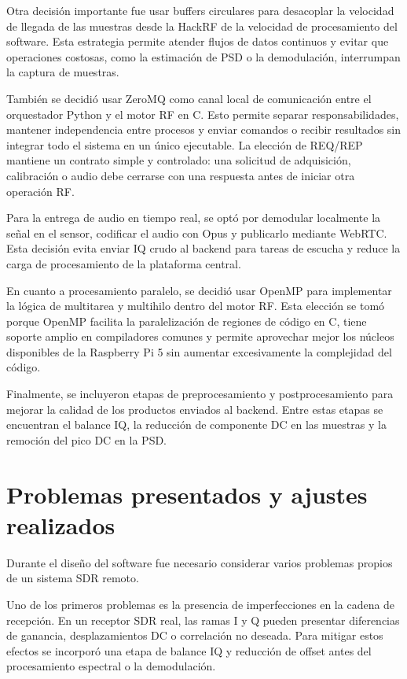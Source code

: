 Otra decisión importante fue usar buffers circulares para desacoplar la velocidad
de llegada de las muestras desde la HackRF de la velocidad de procesamiento del
software. Esta estrategia permite atender flujos de datos continuos y evitar que
operaciones costosas, como la estimación de PSD o la demodulación, interrumpan la
captura de muestras.

También se decidió usar ZeroMQ como canal local de comunicación entre el
orquestador Python y el motor RF en C. Esto permite separar responsabilidades,
mantener independencia entre procesos y enviar comandos o recibir resultados sin
integrar todo el sistema en un único ejecutable. La elección de REQ/REP mantiene
un contrato simple y controlado: una solicitud de adquisición, calibración o audio
debe cerrarse con una respuesta antes de iniciar otra operación RF.

Para la entrega de audio en tiempo real, se optó por demodular localmente la señal
en el sensor, codificar el audio con Opus y publicarlo mediante WebRTC. Esta
decisión evita enviar IQ crudo al backend para tareas de escucha y reduce la carga
de procesamiento de la plataforma central.

En cuanto a procesamiento paralelo, se decidió usar OpenMP para implementar la
lógica de multitarea y multihilo dentro del motor RF. Esta elección se tomó porque
OpenMP facilita la paralelización de regiones de código en C, tiene soporte amplio
en compiladores comunes y permite aprovechar mejor los núcleos disponibles de la
Raspberry Pi 5 sin aumentar excesivamente la complejidad del código.

Finalmente, se incluyeron etapas de preprocesamiento y postprocesamiento para
mejorar la calidad de los productos enviados al backend. Entre estas etapas se
encuentran el balance IQ, la reducción de componente DC en las muestras y la
remoción del pico DC en la PSD.


\section{Problemas presentados y ajustes realizados}

Durante el diseño del software fue necesario considerar varios problemas propios
de un sistema SDR remoto.

Uno de los primeros problemas es la presencia de imperfecciones en la cadena de
recepción. En un receptor SDR real, las ramas I y Q pueden presentar diferencias
de ganancia, desplazamientos DC o correlación no deseada. Para mitigar estos
efectos se incorporó una etapa de balance IQ y reducción de offset antes del
procesamiento espectral o la demodulación.


